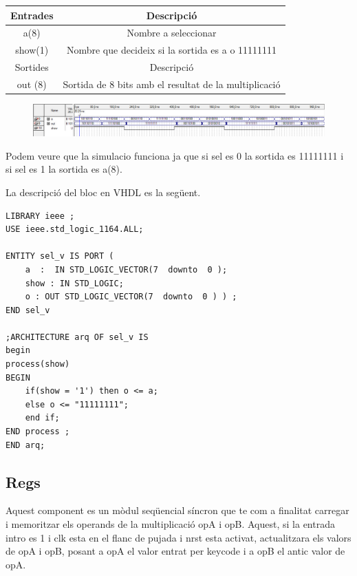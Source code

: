 \documentclass[12pt, a4papre]{article}
\begin{document}
	\begin{table}[h!]
		\centering
		 \begin{tabular}{|c | c|} 
			 \hline
			 Entrades & Descripció\\ [0.5ex] 
			 \hline
			 a(8) &  Nombre a seleccionar\\ 
			 show(1) &  Nombre que decideix si la sortida es a o 11111111\\ 
			 \hline\hline
			 Sortides & Descripció\\ [0.5ex] 
			 \hline
			out (8) & Sortida de 8 bits amb el resultat de la multiplicació\\ 
			 \hline
		 \end{tabular}
	\end{table}
	
	\begin{figure}[H]
		\begin{center}
		\includegraphics[width=130mm]{Simulacio_Sel.jpeg}
		\end{center}
	\end{figure}
	
	Podem veure que la simulacio funciona ja que si sel es 0 la sortida es 11111111 i si sel es 1 la sortida es a(8).
	
	La descripció del bloc en VHDL es la següent.
	
	\begin{lstlisting}[style=vhdl, frame=single, basicstyle=\small]
LIBRARY ieee ; 
USE ieee.std_logic_1164.ALL;

ENTITY sel_v IS PORT (
	a  :  IN STD_LOGIC_VECTOR(7  downto  0 );
	show : IN STD_LOGIC;
	o : OUT STD_LOGIC_VECTOR(7  downto  0 ) ) ;
END sel_v

;ARCHITECTURE arq OF sel_v IS
begin
process(show)
BEGIN
	if(show = '1') then o <= a;
	else o <= "11111111";
	end if;
END process ;
END arq;
\end{lstlisting}
	
	\subsection{Regs}
	
	Aquest component es un mòdul seqüencial síncron que te com a finalitat carregar i memoritzar els operands de la multiplicació opA i opB. Aquest, si la entrada intro es 1 i clk esta en el flanc de pujada i nrst esta activat, actualitzara els valors de opA i opB, posant a opA el valor entrat per keycode i a opB el antic valor de opA.
	
\end{document}
